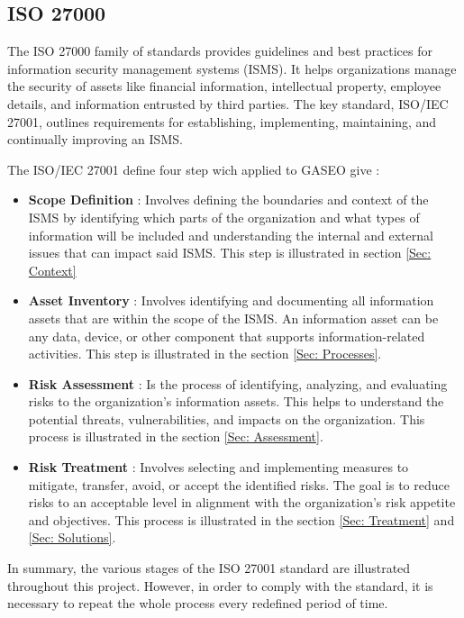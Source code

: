 \documentclass[12pt]{article}
\begin{document}
\subsection{ISO 27000}
The ISO 27000 family of standards provides guidelines and best practices for information security management systems (ISMS). It helps organizations manage the security of assets like financial information, intellectual property, employee details, and information entrusted by third parties. The key standard, ISO/IEC 27001, outlines requirements for establishing, implementing, maintaining, and continually improving an ISMS.

The ISO/IEC 27001 define four step wich applied to GASEO give : 
\begin{itemize}
    \item \textbf{Scope Definition} : Involves defining the boundaries and context of the ISMS by identifying which parts of the organization and what types of information will be included and understanding the internal and external issues that can impact said ISMS. This step is illustrated in section \ref{Sec: Context}
    \item \textbf{Asset Inventory} : Involves identifying and documenting all information assets that are within the scope of the ISMS. An information asset can be any data, device, or other component that supports information-related activities. This step is illustrated in the section \ref{Sec: Processes}.
    \item \textbf{Risk Assessment} : Is the process of identifying, analyzing, and evaluating risks to the organization's information assets. This helps to understand the potential threats, vulnerabilities, and impacts on the organization. This process is illustrated in the section \ref{Sec: Assessment}.
    
    \item \textbf{Risk Treatment} :  Involves selecting and implementing measures to mitigate, transfer, avoid, or accept the identified risks. The goal is to reduce risks to an acceptable level in alignment with the organization's risk appetite and objectives. This process is illustrated in the section \ref{Sec: Treatment} and \ref{Sec: Solutions}. 
\end{itemize}

In summary, the various stages of the ISO 27001 standard are illustrated throughout this project. However, in order to comply with the standard, it is necessary to repeat the whole process every redefined period of time.
\end{document}
